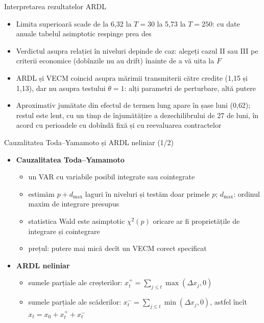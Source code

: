 \begin{frame}{Interpretarea rezultatelor ARDL}
\itemsize{\small}
\begin{itemize}
    \item Limita superioară scade de la 6{,}32 la $T = 30$ la 5{,}73 la $T = 250$: cu date anuale tabelul asimptotic respinge prea des
    \item Verdictul asupra relației în niveluri depinde de caz: alegeți cazul II sau III pe criterii economice (dobînzile nu au drift) înainte de a vă uita la $F$
    \item ARDL și VECM coincid asupra mărimii transmiterii către credite (1{,}15 și 1{,}13), dar nu asupra testului $\theta = 1$: alți parametri de perturbare, altă putere
    \item Aproximativ jumătate din efectul de termen lung apare în șase luni (0{,}62); restul este lent, cu un timp de înjumătățire a dezechilibrului de 27 de luni, în acord cu perioadele cu dobîndă fixă și cu reevaluarea contractelor
\end{itemize}
\end{frame}

\begin{frame}{Cauzalitatea Toda--Yamamoto și ARDL neliniar (1/2)}
\itemsize{\small}
\begin{itemize}
    \item \textbf{Cauzalitatea Toda--Yamamoto} 
    \begin{itemize}
        \item un VAR cu variabile posibil integrate sau cointegrate
        \item estimăm $p + d_{\max}$ laguri în niveluri și testăm doar primele $p$; $d_{\max}$: ordinul maxim de integrare presupus
        \item statistica Wald este asimptotic $\chi^2(p)$ oricare ar fi proprietățile de integrare și cointegrare
        \item prețul: putere mai mică decît un VECM corect specificat
    \end{itemize}
    \item \textbf{ARDL neliniar} 
    \begin{itemize}
        \item sumele parțiale ale creșterilor: $x_t^+ = \sum_{j\le t}\max(\Delta x_j, 0)$
        \item sumele parțiale ale scăderilor: $x_t^- = \sum_{j\le t}\min(\Delta x_j, 0)$, astfel încît $x_t = x_0 + x_t^+ + x_t^-$
    \end{itemize}
\end{itemize}
\end{frame}

